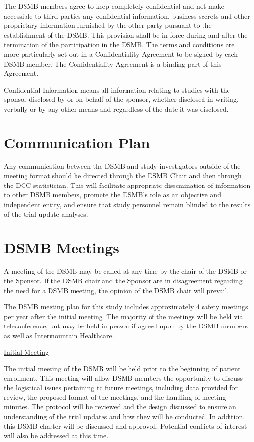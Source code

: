 \documentclass[12pt]{article}
\begin{document}
The DSMB members agree to keep completely confidential and not make 
accessible to third parties any confidential information, business secrets 
and other proprietary information furnished by the other party pursuant to 
the establishment of the DSMB. This provision shall be in force during and 
after the termination of the participation in the DSMB. The terms and 
conditions are more particularly set out in a Confidentiality Agreement to 
be signed by each DSMB member. The Confidentiality Agreement is a binding 
part of this Agreement. 

Confidential Information means all information relating to studies with the 
sponsor disclosed by or on behalf of the sponsor, whether disclosed in 
writing, verbally or by any other means and regardless of the date it was 
disclosed.

\section{Communication Plan}
Any communication between the DSMB and study investigators outside of the 
meeting format should be directed through the DSMB Chair and then through 
the DCC statistician. This will facilitate appropriate dissemination of 
information to other DSMB members, promote the DSMB’s role as an objective 
and independent entity, and ensure that study personnel remain blinded to 
the results of the trial update analyses. 

\section{DSMB Meetings}
A meeting of the DSMB may be called at any time by the chair of the DSMB or 
the Sponsor.  If the DSMB chair and the Sponsor are in disagreement 
regarding the need for a DSMB meeting, the opinion of the DSMB chair will 
prevail.

The DSMB meeting plan for this study includes approximately 4 safety 
meetings per year after the initial meeting. The majority of the meetings 
will be held via teleconference, but may be held in person if agreed upon by 
the DSMB members as well as Intermountain Healthcare.

\vspace{0.4cm}
\noindent \underline{Initial Meeting}

The initial meeting of the DSMB will be held prior to the beginning of 
patient enrollment. This meeting will allow DSMB members the opportunity to 
discuss the logistical issues pertaining to future meetings, including data 
provided for review, the proposed format of the meetings, and the handling 
of meeting minutes. The protocol will be reviewed and the design discussed 
to ensure an understanding of the trial updates and how they will be 
conducted.   In addition, this DSMB charter will be discussed and approved. 
Potential conflicts of interest will also be addressed at this time. 
\end{document}
